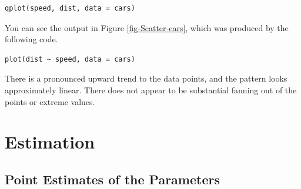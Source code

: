 \documentclass[captions=tableheading]{scrbook}
\begin{document}
\begin{example}
\lstset{language=R}
\begin{lstlisting}
qplot(speed, dist, data = cars)
\end{lstlisting}





You can see the output in Figure \ref{fig-Scatter-cars}, which was produced by the following code.


\lstset{language=R}
\begin{lstlisting}
plot(dist ~ speed, data = cars)
\end{lstlisting}

There is a pronounced upward trend to the data points, and the pattern looks approximately linear. There does not appear to be substantial fanning out of the points or extreme values. 
\end{example}
\section{Estimation}
\label{sec-11-2}
\label{sec-SLR-Estimation}
\subsection{Point Estimates of the Parameters}
\label{sec-11-2-1}
\label{sub-point-estimate-mle-slr}
\end{document}
